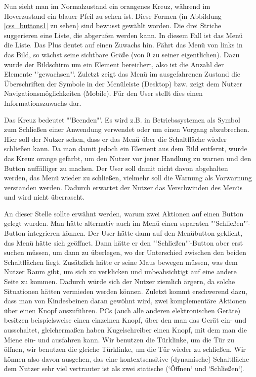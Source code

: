 Nun sieht man im Normalzustand ein orangenes Kreuz, während im Hoverzustand ein blauer Pfeil zu sehen ist. Diese Formen (in Abbildung \ref{css_buttons1} zu sehen) sind bewusst gewählt worden. Die drei Striche suggerieren eine Liste, die abgerufen werden kann. In diesem Fall ist das Menü die Liste. Das Plus deutet auf einen Zuwachs hin. Fährt das Menü von links in das Bild, so wächst seine sichtbare Größe (von 0 zu seiner eigentlichen). Dazu wurde der Bildschirm um ein Element bereichert, also ist die Anzahl der Elemente "'gewachsen"'. Zuletzt zeigt das Menü im ausgefahrenen Zustand die Überschriften der Symbole in der Menüleiste (Desktop) bzw. zeigt dem Nutzer Navigationsmöglichkeiten (Mobile). Für den User stellt dies einen Informationszuwachs dar.

Das Kreuz bedeutet "'Beenden"'. Es wird z.B. in Betriebssystemen als Symbol zum Schließen einer Anwendung verwendet oder um einen Vorgang abzubrechen. Hier soll der Nutzer sehen, dass er das Menü über die Schaltfläche wieder schließen kann. Da man damit jedoch ein Element aus dem Bild entfernt, wurde das Kreuz orange gefärbt, um den Nutzer vor jener Handlung zu warnen und den Button auffälliger zu machen. Der User soll damit nicht davon abgehalten werden, das Menü wieder zu schließen, vielmehr soll die Warnung als Vorwarnung verstanden werden. Dadurch erwartet der Nutzer das Verschwinden des Menüs und wird nicht überrascht.

An dieser Stelle sollte erwähnt werden, warum zwei Aktionen auf einen Button gelegt wurden. Man hätte alternativ auch im Menü einen separaten "'Schließen"'-Button integrieren können. Der User hätte dann auf den Menübutton geklickt, das Menü hätte sich geöffnet. Dann hätte er den "'Schließen"'-Button aber erst suchen müssen, um dann zu überlegen, wo der Unterschied zwischen den beiden Schaltflächen liegt. Zusätzlich hätte er seine Maus bewegen müssen, was dem Nutzer Raum gibt, um sich zu verklicken und unbeabsichtigt auf eine andere Seite zu kommen. Dadurch würde sich der Nutzer ziemlich ärgern, da solche Situationen hätten vermieden werden können. Zuletzt kommt erschwerend dazu, dass man von Kindesbeinen daran gewöhnt wird, zwei komplementäre Aktionen über einen Knopf auszuführen. PCs (auch alle anderen elektronischen Geräte) besitzen beispielsweise einen einzelnen Knopf, über den man das Gerät ein- und ausschaltet, gleichermaßen haben Kugelschreiber einen Knopf, mit dem man die Miene ein- und ausfahren kann. Wir benutzen die Türklinke, um die Tür zu öffnen, wir benutzen die gleiche Türklinke, um die Tür wieder zu schließen. Wir können also davon ausgehen, das  eine kontextsensitive (dynamische) Schaltfläche dem Nutzer sehr viel vertrauter ist als zwei statische (`Öffnen` und `Schließen`).

